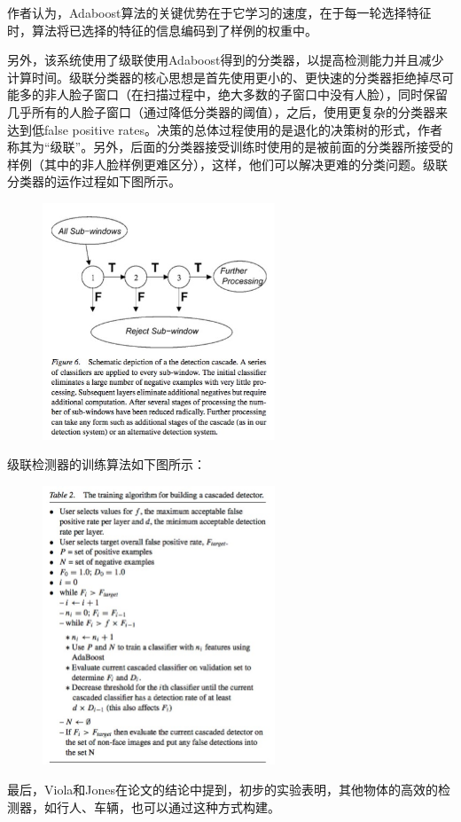作者认为，Adaboost算法的关键优势在于它学习的速度，在于每一轮选择特征时，算法将已选择的特征的信息编码到了样例的权重中。

另外，该系统使用了级联使用Adaboost得到的分类器，以提高检测能力并且减少计算时间。级联分类器的核心思想是首先使用更小的、更快速的分类器拒绝掉尽可能多的非人脸子窗口（在扫描过程中，绝大多数的子窗口中没有人脸），同时保留几乎所有的人脸子窗口（通过降低分类器的阈值），之后，使用更复杂的分类器来达到低false positive rates。决策的总体过程使用的是退化的决策树的形式，作者称其为“级联”。另外，后面的分类器接受训练时使用的是被前面的分类器所接受的样例（其中的非人脸样例更难区分），这样，他们可以解决更难的分类问题。级联分类器的运作过程如下图所示。
\begin{figure}[H]
    \centering 
    \includegraphics[width=0.618\textwidth]{image/2_1_1_4.jpg}    
    \label{logic}
\end{figure}
级联检测器的训练算法如下图所示：
\begin{figure}[H]
    \centering 
    \includegraphics[width=0.618\textwidth]{image/2_1_1_5.jpg}    
    \label{logic}
\end{figure}
最后，Viola和Jones在论文的结论中提到，初步的实验表明，其他物体的高效的检测器，如行人、车辆，也可以通过这种方式构建。
